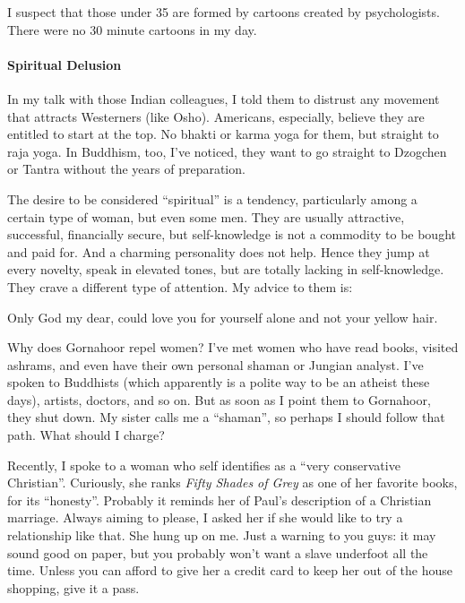 I suspect that those under 35 are formed by cartoons created by psychologists. There were no 30 minute cartoons in my day.

\paragraph{Spiritual Delusion}


In my talk with those Indian colleagues, I told them to distrust any movement that attracts Westerners (like Osho). Americans, especially, believe they are entitled to start at the top. No bhakti or karma yoga for them, but straight to raja yoga. In Buddhism, too, I've noticed, they want to go straight to Dzogchen or Tantra without the years of preparation.

The desire to be considered ``spiritual'' is a tendency, particularly among a certain type of woman, but even some men. They are usually attractive, successful, financially secure, but self-knowledge is not a commodity to be bought and paid for. And a charming personality does not help. Hence they jump at every novelty, speak in elevated tones, but are totally lacking in self-knowledge. They crave a different type of attention. My advice to them is:

\begin{quotex}
Only God my dear, could love you for yourself alone and not your yellow hair.
\end{quotex}

Why does Gornahoor repel women? I've met women who have read books, visited ashrams, and even have their own personal shaman or Jungian analyst. I've spoken to Buddhists (which apparently is a polite way to be an atheist these days), artists, doctors, and so on. But as soon as I point them to Gornahoor, they shut down. My sister calls me a ``shaman'', so perhaps I should follow that path. What should I charge?

Recently, I spoke to a woman who self identifies as a ``very conservative Christian''. Curiously, she ranks \emph{Fifty Shades of Grey} as one of her favorite books, for its ``honesty''. Probably it reminds her of Paul's description of a Christian marriage. Always aiming to please, I asked her if she would like to try a relationship like that. She hung up on me. Just a warning to you guys: it may sound good on paper, but you probably won't want a slave underfoot all the time. Unless you can afford to give her a credit card to keep her out of the house shopping, give it a pass.

